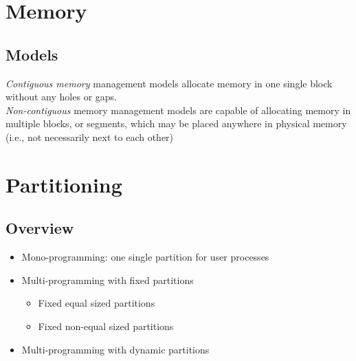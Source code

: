 \documentclass{article}
\begin{document}
\section{Memory}

\subsection{Models}
\begin{flushleft}
\textit{Contiguous memory} management models allocate memory in one single block without any holes or gaps.\\
\textit{Non-contiguous} memory management models are capable of allocating memory in multiple blocks, or segments, which may be placed anywhere in physical memory (i.e., not necessarily next to each other)
\end{flushleft}

\section{Partitioning}

\subsection{Overview}
\begin{itemize}
	\item Mono-programming: one single partition for user processes
	\item Multi-programming with fixed partitions
	\begin{itemize}
		\item Fixed equal sized partitions
		\item Fixed non-equal sized partitions 
	\end{itemize}
	\item Multi-programming with dynamic partitions
\end{itemize}
\end{document}
